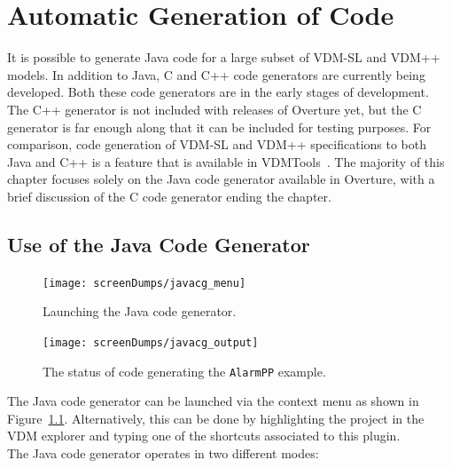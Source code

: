 
\newcommand{\vdmkw}[1]{\texttt{\textbf{#1}}}
\chapter{Automatic Generation of Code}\label{sec:codegen}

It is possible to generate Java code for a
large subset of VDM-SL and VDM++ models. In addition to Java, C and
C++ code generators are currently being developed. Both these code
generators are in the early stages of development. The C++ generator
is not included with releases of Overture yet, but the C generator is
far enough along that it can be included for testing purposes. For
comparison, code generation of VDM-SL and VDM++ specifications to both
Java and C++ is a feature that is available in
VDMTools~\cite{Java2VDMMan,CGMan,CGManPP}. The majority of this
chapter focuses solely on the Java code generator available in
Overture, with a brief discussion of the C code generator ending the
chapter.

\section{Use of the Java Code Generator}
\label{sec:javacg_use}

\begin{figure}[htbp]
\begin{center}
\texttt{[image: screenDumps/javacg\_menu]}
\caption{Launching the Java code generator.\label{fig:javacg_menu}}
\end{center}
\end{figure}

\begin{figure}[htbp]
\begin{center}
\texttt{[image: screenDumps/javacg\_output]}
\caption{The status of code generating the \texttt{AlarmPP}
example.\label{fig:javacg_output}}
\end{center}
\end{figure}

The Java code generator can be launched via the context menu as shown
in Figure~\ref{fig:javacg_menu}. Alternatively, this can be done by
highlighting the project in the VDM explorer and typing one of the
shortcuts associated to this plugin.\\

\noindent The Java code generator operates in two different modes:

